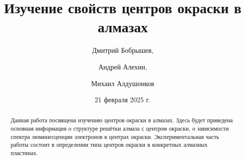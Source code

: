 \title{Изучение свойств центров окраски в алмазах}
\author{Дмитрий Бобрышев,}
\author{Андрей Алехин,}
\author{Михаил Алдушонков}

\date{21 февраля 2025 г.}

\begin{abstract}
    Данная работа посвящена изучению центров окраски в алмазах. 
    Здесь будет приведена основная информация о структуре решётки алмаза
    с центром окраски, о зависимости 
    спектра люминесценции электронов в центрах окраски. Экспериментальная часть
    работы состоит в определении типа центров окраски в конкретных алмазных 
    пластинах.
\end{abstract}

